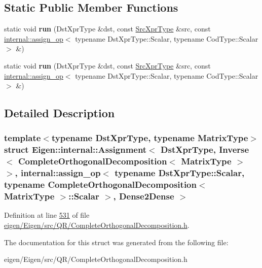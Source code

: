 \subsection*{Static Public Member Functions}
\begin{DoxyCompactItemize}
\item 
\mbox{\label{struct_eigen_1_1internal_1_1_assignment_3_01_dst_xpr_type_00_01_inverse_3_01_complete_orthogonalcd5d352c5ea4dcae855a0a56ba39cbfd_acbb612854432ba8044da1f1368314dfb}} 
static void {\bfseries run} (Dst\+Xpr\+Type \&dst, const \hyperlink{class_eigen_1_1_inverse}{Src\+Xpr\+Type} \&src, const \hyperlink{struct_eigen_1_1internal_1_1assign__op}{internal\+::assign\+\_\+op}$<$ typename Dst\+Xpr\+Type\+::\+Scalar, typename Cod\+Type\+::\+Scalar $>$ \&)
\item 
\mbox{\label{struct_eigen_1_1internal_1_1_assignment_3_01_dst_xpr_type_00_01_inverse_3_01_complete_orthogonalcd5d352c5ea4dcae855a0a56ba39cbfd_acbb612854432ba8044da1f1368314dfb}} 
static void {\bfseries run} (Dst\+Xpr\+Type \&dst, const \hyperlink{class_eigen_1_1_inverse}{Src\+Xpr\+Type} \&src, const \hyperlink{struct_eigen_1_1internal_1_1assign__op}{internal\+::assign\+\_\+op}$<$ typename Dst\+Xpr\+Type\+::\+Scalar, typename Cod\+Type\+::\+Scalar $>$ \&)
\end{DoxyCompactItemize}


\subsection{Detailed Description}
\subsubsection*{template$<$typename Dst\+Xpr\+Type, typename Matrix\+Type$>$\newline
struct Eigen\+::internal\+::\+Assignment$<$ Dst\+Xpr\+Type, Inverse$<$ Complete\+Orthogonal\+Decomposition$<$ Matrix\+Type $>$ $>$, internal\+::assign\+\_\+op$<$ typename Dst\+Xpr\+Type\+::\+Scalar, typename Complete\+Orthogonal\+Decomposition$<$ Matrix\+Type $>$\+::\+Scalar $>$, Dense2\+Dense $>$}



Definition at line \hyperlink{eigen_2_eigen_2src_2_q_r_2_complete_orthogonal_decomposition_8h_source_l00531}{531} of file \hyperlink{eigen_2_eigen_2src_2_q_r_2_complete_orthogonal_decomposition_8h_source}{eigen/\+Eigen/src/\+Q\+R/\+Complete\+Orthogonal\+Decomposition.\+h}.



The documentation for this struct was generated from the following file\+:\begin{DoxyCompactItemize}
\item 
eigen/\+Eigen/src/\+Q\+R/\+Complete\+Orthogonal\+Decomposition.\+h\end{DoxyCompactItemize}

